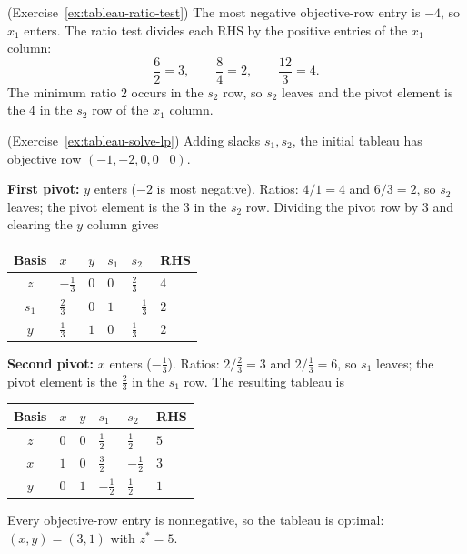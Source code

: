 \begin{solution}(Exercise~\ref{ex:tableau-ratio-test})
The most negative objective-row entry is $-4$, so $x_1$ enters.  The ratio test divides each RHS by the positive entries of the $x_1$ column:
\[
\frac{6}{2} = 3, \qquad \frac{8}{4} = 2, \qquad \frac{12}{3} = 4.
\]
The minimum ratio $2$ occurs in the $s_2$ row, so $s_2$ leaves and the pivot element is the $4$ in the $s_2$ row of the $x_1$ column.
\end{solution}

\begin{solution}(Exercise~\ref{ex:tableau-solve-lp})
Adding slacks $s_1, s_2$, the initial tableau has objective row $(-1, -2, 0, 0 \mid 0)$.

\textbf{First pivot:} $y$ enters ($-2$ is most negative).  Ratios: $4/1 = 4$ and $6/3 = 2$, so $s_2$ leaves; the pivot element is the $3$ in the $s_2$ row.  Dividing the pivot row by $3$ and clearing the $y$ column gives
\begin{center}
\renewcommand{\arraystretch}{1.3}
\begin{tabular}{c|ZZZZ|Z}
\toprule
Basis & $x$ & $y$ & $s_1$ & $s_2$ & RHS\\
\midrule
$z$   & $-\tfrac13$ & $0$ & $0$ & $\tfrac23$ & $4$\\
\midrule
$s_1$ & $\tfrac23$ & $0$ & $1$ & $-\tfrac13$ & $2$\\
$y$   & $\tfrac13$ & $1$ & $0$ & $\tfrac13$  & $2$\\
\bottomrule
\end{tabular}
\end{center}

\textbf{Second pivot:} $x$ enters ($-\tfrac13$).  Ratios: $2/\tfrac23 = 3$ and $2/\tfrac13 = 6$, so $s_1$ leaves; the pivot element is the $\tfrac23$ in the $s_1$ row.  The resulting tableau is
\begin{center}
\renewcommand{\arraystretch}{1.3}
\begin{tabular}{c|ZZZZ|Z}
\toprule
Basis & $x$ & $y$ & $s_1$ & $s_2$ & RHS\\
\midrule
$z$   & $0$ & $0$ & $\tfrac12$ & $\tfrac12$ & $5$\\
\midrule
$x$ & $1$ & $0$ & $\tfrac32$ & $-\tfrac12$ & $3$\\
$y$ & $0$ & $1$ & $-\tfrac12$ & $\tfrac12$ & $1$\\
\bottomrule
\end{tabular}
\end{center}
Every objective-row entry is nonnegative, so the tableau is optimal: $(x, y) = (3, 1)$ with $z^* = 5$.
\end{solution}

